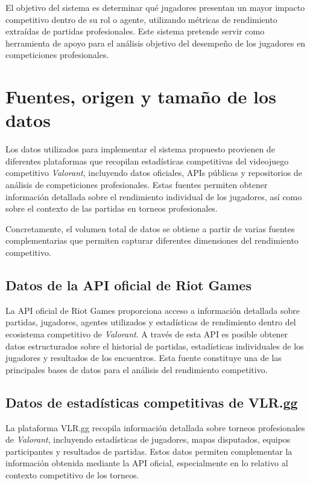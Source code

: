 \documentclass{ULBreport} %
\begin{document}
El objetivo del sistema es determinar qué jugadores presentan un mayor impacto competitivo dentro de su rol o agente, utilizando métricas de rendimiento extraídas de partidas profesionales. Este sistema pretende servir como herramienta de apoyo para el análisis objetivo del desempeño de los jugadores en competiciones profesionales.

\section{Fuentes, origen y tamaño de los datos}

Los datos utilizados para implementar el sistema propuesto provienen de diferentes plataformas que recopilan estadísticas competitivas del videojuego competitivo \textit{Valorant}, incluyendo datos oficiales, APIs públicas y repositorios de análisis de competiciones profesionales. Estas fuentes permiten obtener información detallada sobre el rendimiento individual de los jugadores, así como sobre el contexto de las partidas en torneos profesionales.

Concretamente, el volumen total de datos se obtiene a partir de varias fuentes complementarias que permiten capturar diferentes dimensiones del rendimiento competitivo.

\subsection*{Datos de la API oficial de Riot Games}

La API oficial de Riot Games proporciona acceso a información detallada sobre partidas, jugadores, agentes utilizados y estadísticas de rendimiento dentro del ecosistema competitivo de \textit{Valorant}. A través de esta API es posible obtener datos estructurados sobre el historial de partidas, estadísticas individuales de los jugadores y resultados de los encuentros. Esta fuente constituye una de las principales bases de datos para el análisis del rendimiento competitivo.

\subsection*{Datos de estadísticas competitivas de VLR.gg}

La plataforma VLR.gg recopila información detallada sobre torneos profesionales de \textit{Valorant}, incluyendo estadísticas de jugadores, mapas disputados, equipos participantes y resultados de partidas. Estos datos permiten complementar la información obtenida mediante la API oficial, especialmente en lo relativo al contexto competitivo de los torneos.
\end{document}
